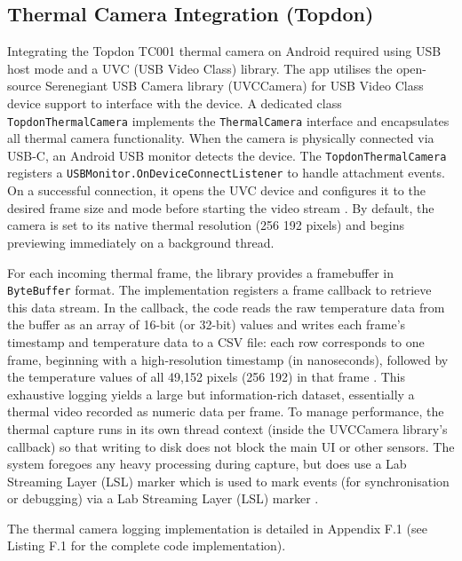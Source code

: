 \subsection{Thermal Camera Integration (Topdon)}\label{sec:4-2-1}
Integrating the Topdon TC001 thermal camera on Android required using USB host mode and a UVC (USB Video Class) library. The app utilises the open-source Serenegiant USB Camera library (UVCCamera) for USB Video Class device support \citep{ref16} to interface with the device. A dedicated class \texttt{TopdonThermalCamera} implements the \texttt{ThermalCamera} interface and encapsulates all thermal camera functionality. When the camera is physically connected via USB-C, an Android USB monitor detects the device. The \texttt{TopdonThermalCamera} registers a \texttt{USBMonitor.OnDeviceConnectListener} to handle attachment events. On a successful connection, it opens the UVC device and configures it to the desired frame size and mode before starting the video stream \citep{ref16}. By default, the camera is set to its native thermal resolution (256\,\texttimes\,192 pixels) and begins previewing immediately on a background thread.

For each incoming thermal frame, the library provides a framebuffer in \texttt{ByteBuffer} format. The implementation registers a frame callback to retrieve this data stream. In the callback, the code reads the raw temperature data from the buffer as an array of 16-bit (or 32-bit) values and writes each frame's timestamp and temperature data to a CSV file: each row corresponds to one frame, beginning with a high-resolution timestamp (in nanoseconds), followed by the temperature values of all 49{,}152 pixels (256\,\texttimes\,192) in that frame \citep{ref16}. This exhaustive logging yields a large but information-rich dataset, essentially a thermal video recorded as numeric data per frame. To manage performance, the thermal capture runs in its own thread context (inside the UVCCamera library's callback) so that writing to disk does not block the main UI or other sensors. The system foregoes any heavy processing during capture, but does use a Lab Streaming Layer (LSL) marker which is used to mark events (for synchronisation or debugging) via a Lab Streaming Layer (LSL) marker \citep{ref9}.

The thermal camera logging implementation is detailed in Appendix F.1 (see Listing F.1 for the complete code implementation).

